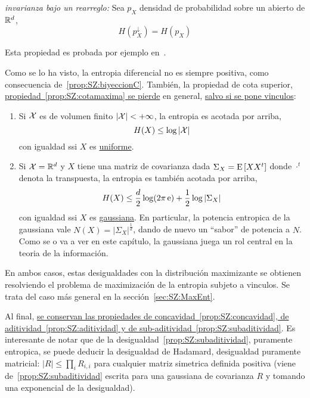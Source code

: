 \begin{propiedadesC}\setcounter{enumi}{\value{PropPermutacion}}
\item\label{prop:SZ:permutacionC} {\it invarianza  bajo un rearreglo:} Sea $p_X$
  densidad   de  probabilidad   sobre   un  abierto   de  $\mathbb{R}^d$,
  \[
  H\left( p_X^\downarrow \right) = H(p_X)
  \]
\end{propiedadesC}
%
\noindent Esta propiedad es probada por ejemplo en~\cite{LieLos01, WanMad04}.


Como  se lo  ha visto,  la  entropia diferencial  no es  siempre positiva,  como
consecuencia  de~\ref{prop:SZ:biyeccionC}.   Tambi\'en,  la  propiedad  de  cota
superior,  \underline{propiedad~\ref{prop:SZ:cotamaxima} se pierde}  en general,
\underline{salvo si se pone vinculos}:
%
\begin{propiedadesC}\setcounter{enumi}{\value{PropCotamaxima}}
\item
  \begin{enumerate}
  \item\label{prop:SZ:cotamaximauniforme} Si $\mathcal{X}$ es de volumen finito $|\mathcal{X}| < +
    \infty$, la entropia es acotada por arriba,
    \[
    H(X) \le \log |\mathcal{X}|
    \]
    con igualdad ssi $X$ es \underline{uniforme}.
  \item\label{prop:SZ:cotamaximagaussiana}  Si  $\mathcal{X} =\mathbb{R}^d$  y  $X$ tiene  una
    matriz  de covarianza  dada  $\Sigma_X  = \operatorname{E}\left[  X  X^t \right]$  donde
    $\cdot^t$  denota  la transpuesta,  la  entropia  es  tambi\'en acotada  por
    arriba,
    \[
    H(X) \le \frac{d}{2} \log(2 \pi \operatorname{e}) + \frac12 \log |\Sigma_X|
    \]
    con igualdad  ssi $X$ es \underline{gaussiana}.  En  particular, la potencia
    entropica de  la gaussiana vale $N(X) =  \left| \Sigma_X \right|^{\frac1d}$,
    dando de nuevo un  ``sabor'' de potencia a $N$.  Como se o  va a ver en este
    cap\'itulo,  la  gaussiana  juega  un   rol  central  en  la  teoria  de  la
    informaci\'on.
  \end{enumerate}
  En  ambos casos,  estas  desigualdades con  la  distribuci\'on maximizante  se
  obtienen resolviendo  el problema de  maximizaci\'on de la entropia  subjeto a
  vinculos.      Se     trata    del     caso     m\'as     general    en     la
  secci\'on~\ref{sec:SZ:MaxEnt}.
\end{propiedadesC}

Al      final,     \underline{se      conservan      las     propiedades      de
  concavidad~\ref{prop:SZ:concavidad},  de aditividad~\ref{prop:SZ:aditividad} y
  de sub-aditividad~\ref{prop:SZ:subaditividad}}.   Es interesante de  notar que
de  la desigualdad~\ref{prop:SZ:subaditividad},  puramente  entropica, se  puede
deducir la  desigualdad de Hadamard,  desigualdad puramente matricial:  $|R| \le
\prod_i  R_{i,i}$  para  cualquier  matriz simetrica  definida  positiva  (viene
de~\ref{prop:SZ:subaditividad} escrita  para una  gaussiana de covarianza  $R$ y
tomando una exponencial de la desigualdad).